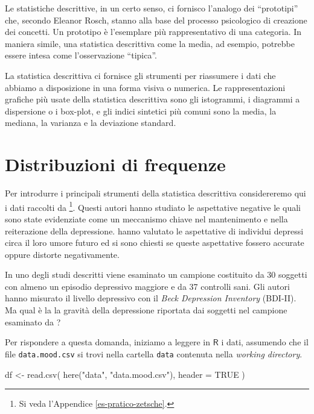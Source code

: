 \documentclass[
  10pt,
  italian,
  a4paper,
  extrafontsizes,onecolumn,openright
  ]{memoir}
\newenvironment{Shaded}{\begin{snugshade}}{\end{snugshade}}
\newcommand{\AttributeTok}[1]{\textcolor[rgb]{0.77,0.63,0.00}{#1}}
\newcommand{\ConstantTok}[1]{\textcolor[rgb]{0.00,0.00,0.00}{#1}}
\newcommand{\FunctionTok}[1]{\textcolor[rgb]{0.00,0.00,0.00}{#1}}
\newcommand{\NormalTok}[1]{#1}
\newcommand{\OtherTok}[1]{\textcolor[rgb]{0.56,0.35,0.01}{#1}}
\newcommand{\StringTok}[1]{\textcolor[rgb]{0.31,0.60,0.02}{#1}}
\newcommand{\R}{\textsf{R}} %
\theoremstyle{definition}
\theoremstyle{definition}
\theoremstyle{definition}
\theoremstyle{definition}
\theoremstyle{remark}
\begin{document}
Le statistiche descrittive, in un certo senso, ci fornisco l'analogo dei
``prototipi'' che, secondo Eleanor Rosch, stanno alla base del processo
psicologico di creazione dei concetti. Un prototipo è l'esemplare più
rappresentativo di una categoria. In maniera simile, una statistica
descrittiva come la media, ad esempio, potrebbe essere intesa come
l'osservazione ``tipica''.

La statistica descrittiva ci fornisce gli strumenti per riassumere i
dati che abbiamo a disposizione in una forma visiva o numerica. Le
rappresentazioni grafiche più usate della statistica descrittiva sono
gli istogrammi, i diagrammi a dispersione o i box-plot, e gli indici
sintetici più comuni sono la media, la mediana, la varianza e la
deviazione standard.

\hypertarget{distribuzioni-di-frequenze}{%
\section{Distribuzioni di frequenze}\label{distribuzioni-di-frequenze}}

Per introdurre i principali strumenti della statistica descrittiva considereremo qui i dati raccolti da \textcite{zetschefuture2019}\footnote{Si veda l'Appendice \ref{es-pratico-zetsche}.}. Questi autori hanno studiato le aspettative negative le quali sono state evidenziate come un meccanismo chiave nel mantenimento e nella reiterazione della depressione. \textcite{zetschefuture2019} hanno valutato le aspettative di individui depressi circa il loro umore futuro ed si sono chiesti se queste aspettative fossero accurate oppure distorte negativamente.

In uno degli studi descritti viene esaminato un campione costituito da 30 soggetti con almeno un episodio depressivo maggiore e da 37 controlli sani. Gli autori hanno misurato il livello depressivo con il \emph{Beck Depression Inventory} (BDI-II). Ma qual è la la gravità della depressione riportata dai soggetti nel campione esaminato da \textcite{zetschefuture2019}?

Per rispondere a questa domanda, iniziamo a leggere in \(\R\) i dati, assumendo che il file \texttt{data.mood.csv} si trovi nella cartella \texttt{data} contenuta nella \emph{working directory}.

\begin{Shaded}
\begin{Highlighting}[]
\NormalTok{df }\OtherTok{\textless{}{-}} \FunctionTok{read.csv}\NormalTok{(}
  \FunctionTok{here}\NormalTok{(}\StringTok{"data"}\NormalTok{, }\StringTok{"data.mood.csv"}\NormalTok{),}
  \AttributeTok{header =} \ConstantTok{TRUE}
\NormalTok{)}
\end{Highlighting}
\end{Shaded}
\end{document}
